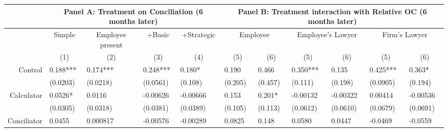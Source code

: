 \begin{tabular}{rrrrrrrrrrr}
\toprule
      & \multicolumn{4}{c}{Panel A: Treatment on Conciliation (6 months later)} & \multicolumn{6}{c}{Panel B: Treatment interaction with Relative OC (6 months later)} \\
\midrule
      & \multicolumn{1}{c}{Simple} & \multicolumn{1}{c}{Employee present} & \multicolumn{1}{c}{+Basic} & \multicolumn{1}{c}{+Strategic} & \multicolumn{2}{c}{Employee} & \multicolumn{2}{c}{Employee's Lawyer} & \multicolumn{2}{c}{Firm's Lawyer} \\
      & \multicolumn{1}{c}{(1)} & \multicolumn{1}{c}{(2)} & \multicolumn{1}{c}{(3)} & \multicolumn{1}{c}{(4)} & \multicolumn{1}{c}{(5)} & \multicolumn{1}{c}{(6)} & \multicolumn{1}{c}{(5)} & \multicolumn{1}{c}{(6)} & \multicolumn{1}{c}{(5)} & \multicolumn{1}{c}{(6)} \\
Control & \multicolumn{1}{l}{0.188***} & \multicolumn{1}{l}{0.174***} & \multicolumn{1}{l}{0.248***} & \multicolumn{1}{l}{0.180*} & \multicolumn{1}{l}{0.190} & \multicolumn{1}{l}{0.466} & \multicolumn{1}{l}{0.350***} & \multicolumn{1}{l}{0.135} & \multicolumn{1}{l}{0.425***} & \multicolumn{1}{l}{0.363*} \\
      & \multicolumn{1}{l}{(0.0203)} & \multicolumn{1}{l}{(0.0218)} & \multicolumn{1}{l}{(0.0561)} & \multicolumn{1}{l}{(0.108)} & \multicolumn{1}{l}{(0.205)} & \multicolumn{1}{l}{(0.457)} & \multicolumn{1}{l}{(0.111)} & \multicolumn{1}{l}{(0.198)} & \multicolumn{1}{l}{(0.0905)} & \multicolumn{1}{l}{(0.194)} \\
Calculator & \multicolumn{1}{l}{0.0526*} & \multicolumn{1}{l}{0.0116} & \multicolumn{1}{l}{-0.00626} & \multicolumn{1}{l}{-0.00666} & \multicolumn{1}{l}{0.153} & \multicolumn{1}{l}{0.201*} & \multicolumn{1}{l}{-0.00132} & \multicolumn{1}{l}{-0.00322} & \multicolumn{1}{l}{0.00414} & \multicolumn{1}{l}{-0.00536} \\
      & \multicolumn{1}{l}{(0.0305)} & \multicolumn{1}{l}{(0.0318)} & \multicolumn{1}{l}{(0.0381)} & \multicolumn{1}{l}{(0.0389)} & \multicolumn{1}{l}{(0.105)} & \multicolumn{1}{l}{(0.113)} & \multicolumn{1}{l}{(0.0612)} & \multicolumn{1}{l}{(0.0610)} & \multicolumn{1}{l}{(0.0679)} & \multicolumn{1}{l}{(0.0691)} \\
Conciliator & \multicolumn{1}{l}{0.0455} & \multicolumn{1}{l}{0.000817} & \multicolumn{1}{l}{-0.00576} & \multicolumn{1}{l}{-0.00289} & \multicolumn{1}{l}{0.0825} & \multicolumn{1}{l}{0.148} & \multicolumn{1}{l}{0.0580} & \multicolumn{1}{l}{0.0447} & \multicolumn{1}{l}{-0.0469} & \multicolumn{1}{l}{-0.0559} \\

\end{tabular}
